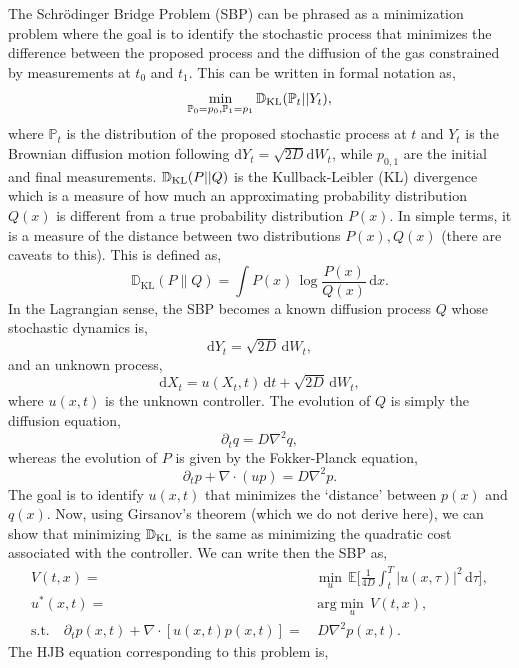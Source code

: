 \documentclass[12pt]{article}
\def\d{\mathrm{d}}
\def\E{\mathbb{E}}
\def\grad{\nabla}
\def\P{\mathbb{P}}
\def\D{\mathbb{D}}
\begin{document}
\begin{singlespace}
The Schr\"odinger Bridge Problem (SBP) can be phrased as a minimization problem where the goal is to identify the stochastic process that minimizes the difference between the proposed process and the diffusion of the gas constrained by measurements at $t_0$ and $t_1$. This can be written in formal notation as,
\[
\min_{\P_0=p_0, \P_1=p_1} \D_{\rm KL} (\P_t||Y_t),
\]
where $\P_t$ is the distribution of the proposed stochastic process at $t$ and $Y_t$ is the Brownian diffusion motion following $\d Y_t = \sqrt{2D} \d W_t$, while $p_{0, 1}$ are the initial and final measurements. $\D_{\rm KL}(P||Q)$ is the Kullback-Leibler (KL) divergence which is a measure of how much an approximating probability distribution $Q(x)$ is different from a true probability distribution $P(x)$. In simple terms, it is a measure of the distance between two distributions $P(x), Q(x)$ (there are caveats to this). This is defined as,
\[
\D_{\text{KL}}(P\parallel Q)= \int P(x)\,\log {\frac {P(x)}{Q(x)}}\,\d x.
\]
In the Lagrangian sense, the SBP becomes a known diffusion process $Q$ whose stochastic dynamics is,
\[
\d Y_t = \sqrt{2D}\,\d W_t,
\]
and an unknown process,
\[
\d X_t = u(X_t, t)\,\d t + \sqrt{2D}\,\d W_t,
\]
where $u(x, t)$ is the unknown controller. The evolution of $Q$ is simply the diffusion equation,
\begin{equation}
    \partial_t q = D \grad^2 q,
    \label{eq:DiffFP}
\end{equation}
whereas the evolution of $P$ is given by the Fokker-Planck equation,
\begin{equation}
    \partial_t p + \grad \cdot (u p) = D \grad^2 p.
    \label{eq:SBPFP}
\end{equation}
The goal is to identify $u(x, t)$ that minimizes the `distance' between $p(x)$ and $q(x)$. Now, using Girsanov's theorem (which we do not derive here), we can show that minimizing $\D_{\rm KL}$ is the same as minimizing the quadratic cost associated with the controller. We can write then the SBP as,
\begin{align}
    V(t, x) =& \min_u\,\E\bigg[ \frac{1}{4D} \int_t^T |u(x, \tau)|^2\,\d \tau \bigg], \\
    u^*(x, t)=&\,\text{arg}\min_u\,V(t, x),\\
    \text{s.t.}\quad\partial_t p(x, t) + \grad \cdot [u(x, t) p(x, t)] =&\,D \grad^2 p(x, t).
\end{align}
The HJB equation corresponding to this problem is,

\end{singlespace}
\end{document}
